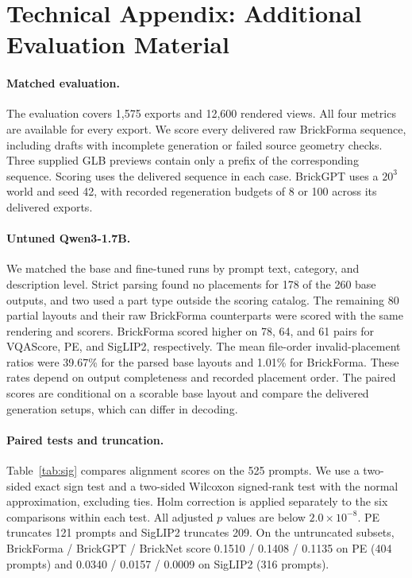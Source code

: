 \documentclass[letterpaper]{article} %
\begin{document}
\section{Technical Appendix: Additional Evaluation Material}
\label{app:eval}

\paragraph{Matched evaluation.}

The evaluation covers 1,575 exports and 12,600 rendered views. All four metrics are available for every export. We score every delivered raw BrickForma sequence, including drafts with incomplete generation or failed source geometry checks. Three supplied GLB previews contain only a prefix of the corresponding sequence. Scoring uses the delivered sequence in each case. BrickGPT uses a $20^3$ world and seed 42, with recorded regeneration budgets of 8 or 100 across its delivered exports.


\paragraph{Untuned Qwen3-1.7B.} We matched the base and fine-tuned runs by prompt text, category, and description level. Strict parsing found no placements for 178 of the 260 base outputs, and two used a part type outside the scoring catalog. The remaining 80 partial layouts and their raw BrickForma counterparts were scored with the same rendering and scorers. BrickForma scored higher on 78, 64, and 61 pairs for VQAScore, PE, and SigLIP2, respectively. The mean file-order invalid-placement ratios were 39.67\% for the parsed base layouts and 1.01\% for BrickForma. These rates depend on output completeness and recorded placement order. The paired scores are conditional on a scorable base layout and compare the delivered generation setups, which can differ in decoding.

\paragraph{Paired tests and truncation.}
Table~\ref{tab:sig} compares alignment scores on the 525 prompts. We use a two-sided exact sign test and a two-sided Wilcoxon signed-rank test with the normal approximation, excluding ties. Holm correction is applied separately to the six comparisons within each test. All adjusted $p$ values are below $2.0{\times}10^{-8}$. PE truncates 121 prompts and SigLIP2 truncates 209. On the untruncated subsets, BrickForma / BrickGPT / BrickNet score 0.1510 / 0.1408 / 0.1135 on PE (404 prompts) and 0.0340 / 0.0157 / 0.0009 on SigLIP2 (316 prompts).
\end{document}
